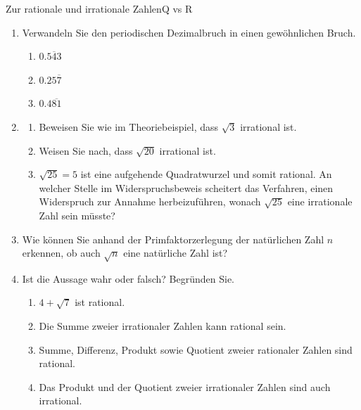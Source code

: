 \begin{ueb}
    {Zur rationale und irrationale Zahlen}{Q vs R}
    \begin{enumerate}
        \item
              Verwandeln Sie den periodischen Dezimalbruch in einen gewöhnlichen Bruch.
              \begin{enumerate}
                  \item \(0.\overline{543}\)
                  \item \(0.25\overline{7}\)
                  \item \(0.4\overline{81}\)
              \end{enumerate}


        \item
              \begin{enumerate}
                  \item Beweisen Sie wie im Theoriebeispiel, dass \(\sqrt{3}\) irrational ist.
                  \item Weisen Sie nach, dass \(\sqrt{20}\) irrational ist.
                  \item \(\sqrt{25}=5\) ist eine aufgehende Quadratwurzel und somit rational. An welcher Stelle im Widerspruchsbeweis scheitert das Verfahren, einen Widerspruch zur Annahme herbeizuführen, wonach \(\sqrt{25}\) eine irrationale Zahl sein müsste?
              \end{enumerate}

        \item Wie können Sie anhand der Primfaktorzerlegung der natürlichen Zahl \(n\) erkennen, ob auch \(\sqrt{n}\) eine natürliche Zahl ist?


        \item Ist die Aussage wahr oder falsch? Begründen Sie.

              \begin{enumerate}
                  \item \(4+\sqrt{7}\) ist rational.
                  \item Die Summe zweier irrationaler Zahlen kann rational sein.
                  \item Summe, Differenz, Produkt sowie Quotient zweier rationaler Zahlen sind rational.
                  \item Das Produkt und der Quotient zweier irrationaler Zahlen sind auch irrational.
              \end{enumerate}

    \end{enumerate}
\end{ueb}

